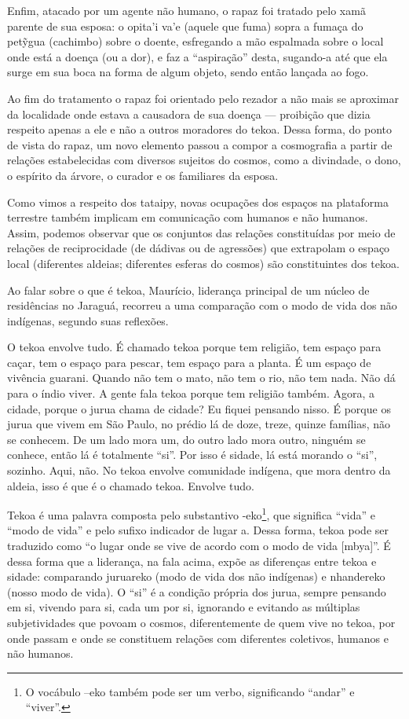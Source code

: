 Enfim, atacado por um agente não humano, o rapaz foi tratado pelo xamã
parente de sua esposa: o opita’i va’e (aquele que fuma) sopra a fumaça
do pet\~{y}gua (cachimbo) sobre o doente, esfregando a mão espalmada
sobre o local onde está a doença (ou a dor), e faz a ``aspiração'' desta,
sugando-a até que ela surge em sua boca na forma de algum objeto, sendo
então lançada ao fogo. 

Ao fim do tratamento o rapaz foi orientado pelo rezador a não mais se
aproximar da localidade onde estava a causadora de sua doença ---
proibição que dizia respeito apenas a ele e não a outros moradores do
tekoa. Dessa forma, do ponto de vista do rapaz, um novo elemento passou
a compor a cosmografia a partir de relações estabelecidas com diversos
sujeitos do cosmos, como a divindade, o dono, o espírito da árvore, o
curador e os familiares da esposa.

Como vimos a respeito dos tataipy, novas ocupações dos espaços na
plataforma terrestre também implicam em comunicação com humanos e não
humanos. Assim, podemos observar que os conjuntos das relações
constituídas por meio de relações de reciprocidade (de dádivas ou de
agressões) que extrapolam o espaço local (diferentes aldeias;
diferentes esferas do cosmos) são constituintes dos tekoa.

Ao falar sobre o que é tekoa, Maurício, liderança principal de um núcleo
de residências no Jaraguá, recorreu a uma comparação com o modo de vida
dos não indígenas, segundo suas reflexões.

O tekoa envolve tudo. É chamado tekoa porque tem religião, tem espaço
para caçar, tem o espaço para pescar, tem espaço para a planta. É um
espaço de vivência guarani. Quando não tem o mato, não tem o rio, não
tem nada. Não dá para o índio viver. A gente fala tekoa porque tem
religião também. Agora, a cidade, porque o jurua chama de cidade? Eu
fiquei pensando nisso. É porque os jurua que vivem em São Paulo, no
prédio lá de doze, treze, quinze famílias, não se conhecem. De um lado
mora um, do outro lado mora outro, ninguém se conhece, então lá é
totalmente ``si''. Por isso é sidade, lá está morando o ``si'', sozinho.
Aqui, não. No tekoa envolve comunidade indígena, que mora dentro da
aldeia, isso é que é o chamado tekoa. Envolve tudo.

Tekoa é uma palavra composta pelo substantivo -eko\footnote{O vocábulo
–eko também pode ser um verbo, significando ``andar'' e ``viver''.}, que
significa ``vida'' e ``modo de vida'' e pelo sufixo indicador de lugar a.
Dessa forma, tekoa pode ser traduzido como ``o lugar onde se vive de
acordo com o modo de vida [mbya]''. É dessa forma que a liderança, na
fala acima, expõe as diferenças entre tekoa e sidade: comparando
juruareko (modo de vida dos não indígenas) e nhandereko (nosso modo de
vida). O ``si'' é a condição própria dos jurua, sempre pensando em si,
vivendo para si, cada um por si, ignorando e evitando as múltiplas
subjetividades que povoam o cosmos, diferentemente de quem vive no
tekoa, por onde passam e onde se constituem relações com diferentes
coletivos, humanos e não humanos.

